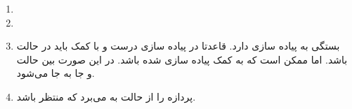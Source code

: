 \begin{enumerate}
    \item {}
    \item {}
    \item بستگی به پیاده سازی دارد.
    قاعدتا در پیاده سازی درست و با کمک
    باید در حالت
    باشد. اما ممکن است که به کمک
    پیاده سازی شده باشد. در این صورت بین حالت
     و 
    جا به جا می‌شود.
    \item پردازه را از حالت
     به 
    می‌برد که منتظر
    باشد.
\end{enumerate}





